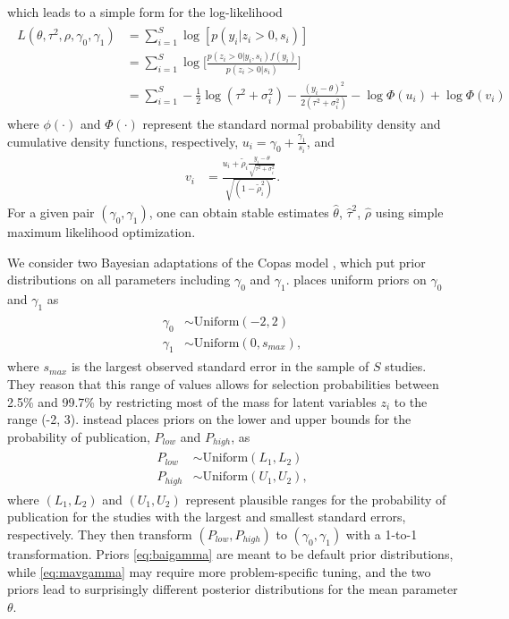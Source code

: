\documentclass[12pt]{article}   	%
\numberwithin{equation}{section}
\begin{document}
which leads to a simple form for the log-likelihood 
\begin{align}
\begin{split}
L(\theta, \tau^2, \rho, \gamma_0, \gamma_1) &= \sum_{i = 1} ^ S \log[p(y_i \vert z_i > 0, s_i)] \\
& = \sum_{i = 1} ^ S \log \Bigg[ \frac{p(z_i > 0 \vert y_i, s_i) f(y_i)}{p(z_i > 0 \vert s_i)} \Bigg] \\
& = \sum_{i = 1} ^ S -\frac{1}{2} \log(\tau^2 + \sigma_i^2) - \frac{(y_i - \theta)^2}{2(\tau^2 + \sigma_i^2)} - \log \Phi(u_i) + \log \Phi(v_i) \label{eq:loglik}
\end{split}
\end{align}
where $\phi(\cdot)$ and $\Phi(\cdot)$ represent the standard normal probability density and cumulative density functions, respectively, $u_i = \gamma_0 + \frac{\gamma_1}{s_i}$, and 
\begin{align}
v_i &= \frac{u_i + \tilde{\rho}_i \frac{y_i - \theta}{\sqrt{\tau^2 + \sigma_i^2}}}{\sqrt{(1 - \tilde{\rho}_i^2)}}.
\end{align}
For a given pair $(\gamma_0, \gamma_1)$, one can obtain stable estimates $\hat{\theta}$, $\hat{\tau}^2$, $\hat{\rho}$ using simple maximum likelihood optimization.

We consider two Bayesian adaptations of the Copas model \citep{mavridis2013copas, bai2020}, which put prior distributions on all parameters including $\gamma_0$ and $\gamma_1$. \citet{bai2020} places uniform priors on $\gamma_0$ and $\gamma_1$ as
\begin{align}
\begin{split}
\gamma_0 & \sim \text{Uniform}(-2, 2) \\
\gamma_1 & \sim \text{Uniform}(0, s_{max}), \label{eq:baigamma}
\end{split}
\end{align}
where $s_{max}$ is the largest observed standard error in the sample of $S$ studies. They reason that this range of values allows for selection probabilities between 2.5\% and 99.7\% by restricting most of the mass for latent variables $z_i$ to the range (-2, 3). \citet{mavridis2013copas} instead places priors on the lower and upper bounds for the probability of publication, $P_{low}$ and $P_{high}$, as
\begin{align}
\begin{split}
P_{low} & \sim \text{Uniform}(L_1, L_2) \\
P_{high} & \sim \text{Uniform}(U_1, U_2), \label{eq:mavgamma}
\end{split}
\end{align} 
where $(L_1, L_2)$ and $(U_1, U_2)$ represent plausible ranges for the probability of publication for the studies with the largest and smallest standard errors, respectively. They then transform $(P_{low}, P_{high})$ to $(\gamma_0, \gamma_1)$ with a 1-to-1 transformation. Priors \eqref{eq:baigamma} are meant to be default prior distributions, while \eqref{eq:mavgamma} may require more problem-specific tuning, and the two priors lead to surprisingly different posterior distributions for the mean parameter $\theta$. 
\end{document}
